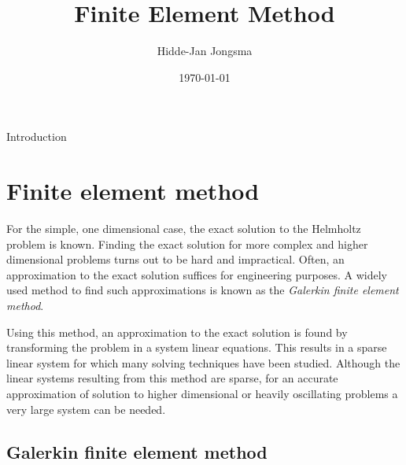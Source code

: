 \documentclass[a4paper]{article}
\author{Hidde-Jan Jongsma}
\title{Finite Element Method}
\date{\today}
\begin{document}
Introduction

\section{Finite element method}

For the simple, one dimensional case, the exact solution to the
Helmholtz problem is known. Finding the exact solution for more
complex and higher dimensional problems turns out to be hard and
impractical.  Often, an approximation to the exact solution suffices
for engineering purposes. A widely used method to find such
approximations is known as the \emph{Galerkin finite element method}.

Using this method, an approximation to the exact solution is found by
transforming the problem in a system linear equations.  This results
in a sparse linear system for which many solving techniques have been
studied. Although the linear systems resulting from this
method are sparse, for an accurate approximation of solution to higher
dimensional or heavily oscillating problems a very large system can be
needed.

%

\subsection{Galerkin finite element method} \label{seq:Galerkin}
\end{document}
